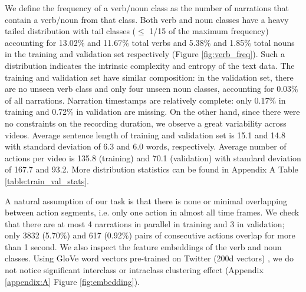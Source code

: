 We define the frequency of a verb/noun class as the number of narrations that contain a verb/noun from that class. Both verb and noun classes have a heavy tailed distribution with tail classes ($\le$ 1/15 of the maximum frequency) accounting for 13.02$\%$ and 11.67$\%$ total verbs and 5.38$\%$ and 1.85$\%$ total nouns in the training and validation set respectively (Figure \ref{fig:verb_freq}). Such a distribution indicates the intrinsic complexity and entropy of the text data. The training and validation set have similar composition: in the validation set, there are no unseen verb class and only four unseen noun classes, accounting for 0.03$\%$ of all narrations. Narration timestamps are relatively complete: only 0.17$\%$ in training and 0.72$\%$ in validation are missing. On the other hand, since there were no constraints on the recording duration, we observe a great variability across videos. Average sentence length of training and validation set is 15.1 and 14.8 with standard deviation of 6.3 and 6.0 words, respectively. Average number of actions per video is 135.8 (training) and 70.1 (validation) with standard deviation of 167.7 and 93.2. More distribution statistics can be found in Appendix A Table \ref{table:train_val_stats}.

A natural assumption of our task is that there is none or minimal overlapping between action segments, i.e. only one action in almost all time frames. We check that there are at most 4 narrations in parallel in training and 3 in validation; only 3832 (5.70$\%$) and 617 (0.92$\%$) pairs of consecutive actions overlap for more than 1 second. We also inspect the feature embeddings of the verb and noun classes. Using GloVe word vectors pre-trained on Twitter (200d vectors) \cite{pennington2014glove}, we do not notice significant interclass or intraclass clustering effect (Appendix \ref{appendix:A} Figure \ref{fig:embedding}).

